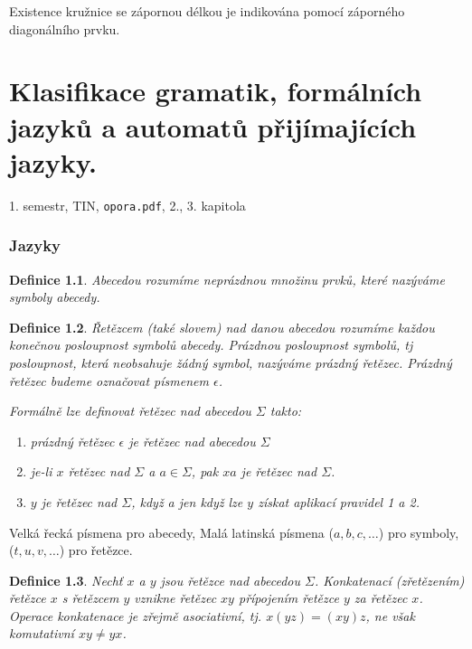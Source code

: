 \documentclass[a4paper, 11pt]{report}
\newtheorem{mydef}{Definice}[chapter]
\begin{document}
Existence kružnice se zápornou délkou je indikována pomocí záporného diagonálního prvku.





\chapter{Klasifikace gramatik, formálních jazyků a automatů přijímajících jazyky.} \label{cha:16}

1. semestr, TIN, \texttt{opora.pdf}, 2., 3. kapitola

\subsection{Jazyky}
\begin{mydef}
Abecedou rozumíme neprázdnou množinu prvků, které nazýváme \emph{symboly abecedy}.
\end{mydef}

\begin{mydef}
\emph{Řetězcem} (také slovem) nad danou abecedou rozumíme každou konečnou posloupnost symbolů abecedy. Prázdnou posloupnost symbolů, tj posloupnost, která neobsahuje žádný symbol, nazýváme \emph{prázdný řetězec}. Prázdný řetězec budeme označovat písmenem $\epsilon$.

Formálně lze definovat řetězec nad abecedou $\Sigma$ takto:
\begin{enumerate}[(1)]
	\item prázdný řetězec $\epsilon$ je řetězec nad abecedou $\Sigma$
	\item je-li $x$ řetězec nad $\Sigma$ a $a \in \Sigma$, pak $xa$ je řetězec nad $\Sigma$.
	\item $y$ je řetězec nad $\Sigma$, když a jen když lze $y$ získat aplikací pravidel 1 a 2.
\end{enumerate}
\end{mydef}

Velká řecká písmena pro abecedy, Malá latinská písmena ($a, b, c, \dots$) pro symboly, ($t, u, v, \dots$) pro řetězce.

\begin{mydef}
Nechť $x$ a $y$ jsou řetězce nad abecedou $\Sigma$. \emph{Konkatenací} (zřetězením) řetězce $x$ s řetězcem $y$ vznikne řetězec $xy$ přípojením řetězce $y$ za řetězec $x$. Operace konkatenace je zřejmě asociativní, tj. $x(yz) = (xy)z$, ne však komutativní $xy \not= yx$.
\end{mydef}
\end{document}
